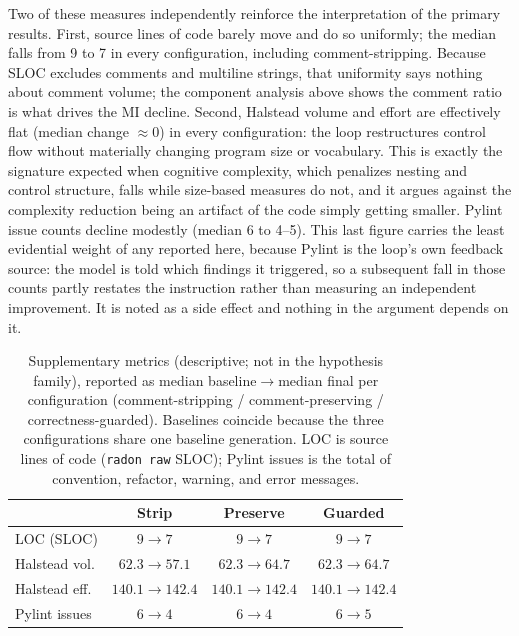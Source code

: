 Two of these measures independently reinforce the interpretation of the primary
results. First, source lines of code barely move and do so uniformly; the median falls from 9 to 7 in every configuration, including comment-stripping. Because SLOC excludes comments and multiline strings, that uniformity says nothing
about comment volume; the component analysis above shows the comment ratio is what
drives the MI decline. Second, Halstead
volume and effort are effectively flat (median change $\approx 0$) in every
configuration: the loop restructures control flow without materially changing
program size or vocabulary. This is exactly the signature expected when cognitive
complexity, which penalizes nesting and control structure, falls while size-based
measures do not, and it argues against the complexity reduction being an artifact
of the code simply getting smaller. Pylint issue counts decline modestly (median 6
to 4--5). This last figure carries the least evidential weight of any reported
here, because Pylint is the loop's own feedback source: the model is told which
findings it triggered, so a subsequent fall in those counts partly restates the
instruction rather than measuring an independent improvement. It is noted as a
side effect and nothing in the argument depends on it.

\begin{table}[t]
  \centering
  \footnotesize
  \setlength{\tabcolsep}{4pt}
  \caption{Supplementary metrics (descriptive; not in the hypothesis family),
    reported as median baseline$\rightarrow$median final per configuration
    (comment-stripping / comment-preserving / correctness-guarded). Baselines
    coincide because the three configurations share one baseline generation. LOC
    is source lines of code (\texttt{radon raw} SLOC); Pylint issues is the total
    of convention, refactor, warning, and error messages.}
  \label{tab:supp}
  \begin{tabular}{lccc}
    \toprule
    & \textbf{Strip} & \textbf{Preserve} & \textbf{Guarded} \\
    \midrule
    LOC (SLOC)      & $9\!\to\!7$         & $9\!\to\!7$         & $9\!\to\!7$ \\
    Halstead vol.   & $62.3\!\to\!57.1$   & $62.3\!\to\!64.7$   & $62.3\!\to\!64.7$ \\
    Halstead eff.   & $140.1\!\to\!142.4$ & $140.1\!\to\!142.4$ & $140.1\!\to\!142.4$ \\
    Pylint issues   & $6\!\to\!4$         & $6\!\to\!4$         & $6\!\to\!5$ \\
    \bottomrule
  \end{tabular}
\end{table}

